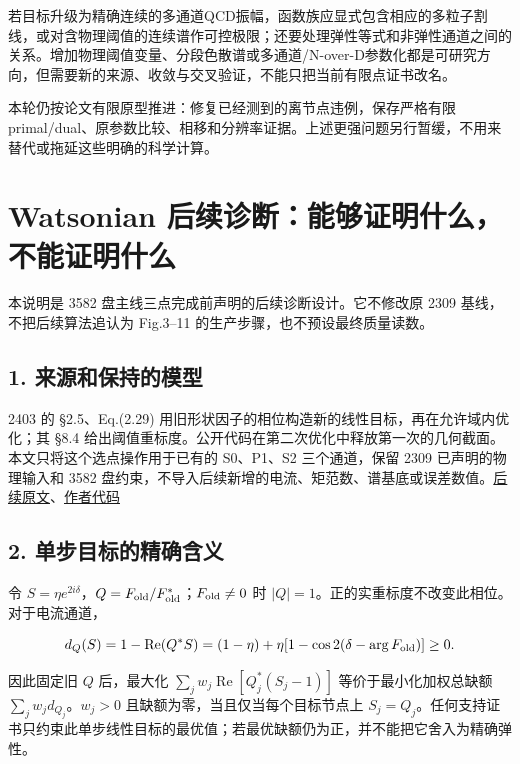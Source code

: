 \documentclass[
  10pt,
  a4paper,
]{article}
\begin{document}
若目标升级为精确连续的多通道QCD振幅，函数族应显式包含相应的多粒子割线，或对含物理阈值的连续谱作可控极限；还要处理弹性等式和非弹性通道之间的关系。增加物理阈值变量、分段色散谱或多通道/N-over-D参数化都是可研究方向，但需要新的来源、收敛与交叉验证，不能只把当前有限点证书改名。

本轮仍按论文有限原型推进：修复已经测到的离节点违例，保存严格有限primal/dual、原参数比较、相移和分辨率证据。上述更强问题另行暂缓，不用来替代或拖延这些明确的科学计算。

\newpage

\section{Watsonian
后续诊断：能够证明什么，不能证明什么}\label{watsonian-ux540eux7eedux8bcaux65adux80fdux591fux8bc1ux660eux4ec0ux4e48ux4e0dux80fdux8bc1ux660eux4ec0ux4e48}

本说明是 3582 盘主线三点完成前声明的后续诊断设计。它不修改原 2309
基线，不把后续算法追认为 Fig.3--11 的生产步骤，也不预设最终质量读数。

\subsection{1.
来源和保持的模型}\label{ux6765ux6e90ux548cux4fddux6301ux7684ux6a21ux578b}

2403 的 §2.5、Eq.(2.29)
用旧形状因子的相位构造新的线性目标，再在允许域内优化；其 §8.4
给出阈值重标度。公开代码在第二次优化中释放第一次的几何截面。本文只将这个选点操作用于已有的
S0、P1、S2 三个通道，保留 2309 已声明的物理输入和 3582
盘约束，不导入后续新增的电流、矩范数、谱基底或误差数值。\href{https://arxiv.org/html/2403.10772v4\#S2.SS5}{后续原文}、\href{https://github.com/hyfysics/gauge-theory-bootstrap/blob/c8409331d5df911f592e53e5a43628418a39b213/theories/qcd/papers/arxiv-2403.10772/GTB_numerics.m}{作者代码}

\subsection{2.
单步目标的精确含义}\label{ux5355ux6b65ux76eeux6807ux7684ux7cbeux786eux542bux4e49}

令
\(S=\eta e^{2i\delta}\)，\(Q=F_{\rm old}/F_{\rm old}^{*}\)；\(F_{\rm old}\ne0\)
时 \(|Q|=1\)。正的实重标度不改变此相位。对于电流通道，

\[
d_Q(S)=1-\operatorname{Re}(Q^*S)
=(1-\eta)+\eta[1-\cos 2(\delta-\arg F_{\rm old})]\ge0.
\]

因此固定旧 \(Q\) 后，最大化
\(\sum_j w_j\operatorname{Re}[Q_j^*(S_j-1)]\) 等价于最小化加权总缺额
\(\sum_jw_jd_{Q_j}\)。\(w_j>0\) 且缺额为零，当且仅当每个目标节点上
\(S_j=Q_j\)。任何支持证书只约束此单步线性目标的最优值；若最优缺额仍为正，并不能把它舍入为精确弹性。
\end{document}
